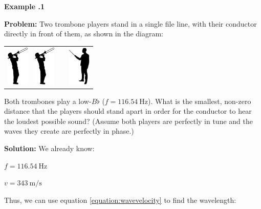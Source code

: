	\newpage 
	
	
	\begin{mdframed}[backgroundcolor=blue!10!white]
		\begin{center}
			
			
			\textbf{Example \thesection.1}	
		\end{center}
		
		\textbf{Problem: } Two trombone players stand in a single file line, with their conductor directly in front of them, as shown in the diagram: 
		
		\begin{center}
			\begin{tabular}{c c c c}
				\includegraphics[height=0.75in]{Chapters/Ch10-Waves/trombone.png} & \includegraphics[height=0.75in]{Chapters/Ch10-Waves/trombone.png} & &
				\includegraphics[height=0.75in]{Chapters/Ch10-Waves/conductor.png}
			\end{tabular}
		\end{center}
		\vspace{0.2in}
		Both trombones play a low-$B \flat$ ($f = \SI{116.54}{\Hz}$).  What is the smallest, non-zero distance that the players should stand apart in order for the conductor to hear the loudest possible sound?  (Assume both players are perfectly in tune and the waves they create are perfectly in phase.)
		
		
		
		
		
		\textbf{Solution:} 
		We already know:
		\begin{center}
			$f = \SI{116.54}{\Hz}$
			
			$v = \SI[per-mode = symbol]{343}{\m\per\s}$
		\end{center}
		Thus, we can use equation \ref{equation:wavevelocity} to find the wavelength:
		

\end{mdframed}
